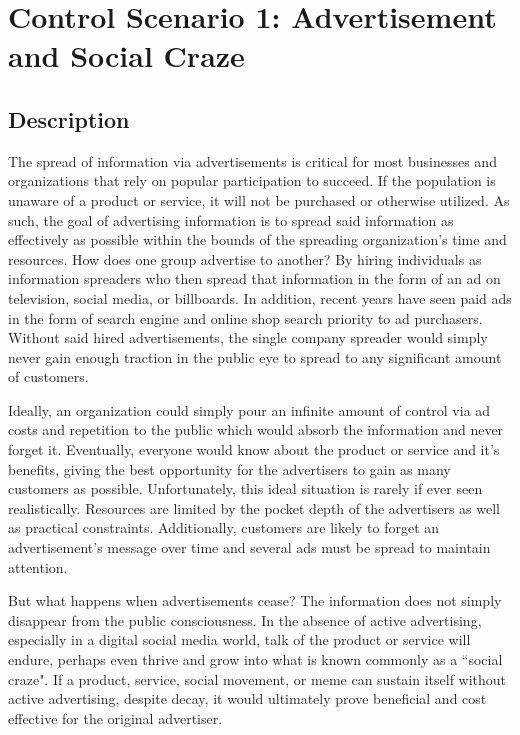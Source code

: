 \chapter{Control Scenario 1: Advertisement and Social Craze} \label{chapter_control_craze}

\section{Description}
The spread of information via advertisements is critical for most businesses and organizations that rely on popular participation to succeed. If the population is unaware of a product or service, it will not be purchased or otherwise utilized. As such, the goal of advertising information is to spread said information as effectively as possible within the bounds of the spreading organization's time and resources. How does one group advertise to another? By hiring individuals as information spreaders who then spread that information in the form of an ad on television, social media, or billboards. In addition, recent years have seen paid ads in the form of search engine and online shop search priority to ad purchasers. Without said hired advertisements, the single company spreader would simply never gain enough traction in the public eye to spread to any significant amount of customers.

Ideally, an organization could simply pour an infinite amount of control via ad costs and repetition to the public which would absorb the information and never forget it. Eventually, everyone would know about the product or service and it's benefits, giving the best opportunity for the advertisers to gain as many customers as possible. Unfortunately, this ideal situation is rarely if ever seen realistically. Resources are limited by the pocket depth of the advertisers as well as practical constraints. Additionally, customers are likely to forget an advertisement's message over time and several ads must be spread to maintain attention.

But what happens when advertisements cease? The information does not simply disappear from the public consciousness. In the absence of active advertising, especially in a digital social media world, talk of the product or service will endure, perhaps even thrive and grow into what is known commonly as a ``social craze". If a product, service, social movement, or meme can sustain itself without active advertising, despite decay, it would ultimately prove beneficial and cost effective for the original advertiser.

